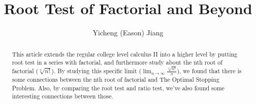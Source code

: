 \documentclass{article}
\title{Root Test of Factorial and Beyond}
\author{Yicheng (Eason) Jiang}
\begin{document}
\maketitle

\begin{abstract}
This article extends the regular college level calculus II into a higher level by putting root test in a series with factorial, and furthermore study about the nth root of factorial ($\sqrt[n]{n!}$). By studying this specific limit ($ \displaystyle \lim_{n \to \infty }\frac{\sqrt[n]{n!}}{n}$), we found that there is some connections between the nth root of factorial and The Optimal Stopping Problem. Also, by comparing the root test and ratio test, we've also found some interesting connections between those. 
\end{abstract}
\end{document}
